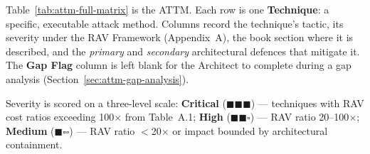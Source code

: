 Table~\ref{tab:attm-full-matrix} is the ATTM.  Each row is one
\textbf{Technique}: a specific, executable attack method.  Columns
record the technique's tactic, its severity under the RAV Framework
(Appendix~A), the book section where it is described, and the
\emph{primary} and \emph{secondary} architectural defences that
mitigate it.  The \textbf{Gap Flag} column is left blank for the
Architect to complete during a gap analysis (Section~\ref{sec:attm-gap-analysis}).

Severity is scored on a three-level scale:
\textbf{Critical} ($\blacksquare\blacksquare\blacksquare$) ---
techniques with RAV cost ratios exceeding 100$\times$ from
Table~A.1; \textbf{High}
($\blacksquare\blacksquare\square$) --- RAV ratio 20--100$\times$;
\textbf{Medium} ($\blacksquare\square\square$) --- RAV ratio
$<$20$\times$ or impact bounded by architectural containment.

\newcommand{\critical}{$\blacksquare\blacksquare\blacksquare$}
\newcommand{\high}{$\blacksquare\blacksquare\square$}
\newcommand{\medium}{$\blacksquare\square\square$}
\newcommand{\gapblank}{\underline{\hspace{1.2cm}}}

